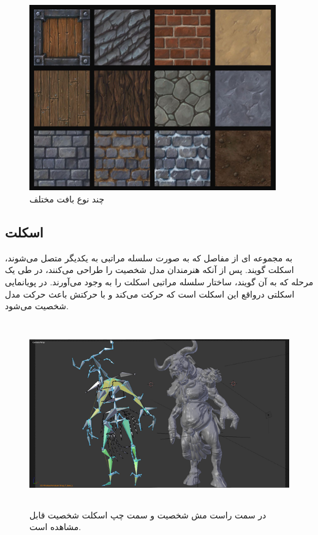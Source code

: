 \begin{figure}[ht]
	\centerline{\includegraphics[width=\textwidth,height=8cm,keepaspectratio]{Figures/Ch2/texture.png}}

	\caption{چند نوع بافت مختلف\cite{TextureSource}}
	\label{fig:Texture}
\end{figure}


\subsection{اسکلت}

به مجمو‌عه ای از مفاصل که به صورت سلسله مراتبی به یکدیگر متصل می‌شوند، اسکلت گویند. پس از آنکه هنرمندان مدل شخصیت را طراحی می‌کنند، در طی یک مرحله که به آن
گویند، ساختار سلسله مراتبی اسکلت را به وجود می‌آورند.
در پویانمایی اسکلتی درواقع این اسکلت‌ است که حرکت می‌کند و با حرکتش باعث حرکت مدل شخصیت می‌شود.


\begin{figure}[ht]
	\centerline{\includegraphics[width=\textwidth,height=8cm,keepaspectratio]{Figures/Ch2/SkeletalModel.png}}

	\caption{در سمت راست مش شخصیت و سمت چپ اسکلت شخصیت قابل مشاهده است.\cite{SkeletalModelSource}}
	\label{fig:SkeletalModel}
\end{figure}




